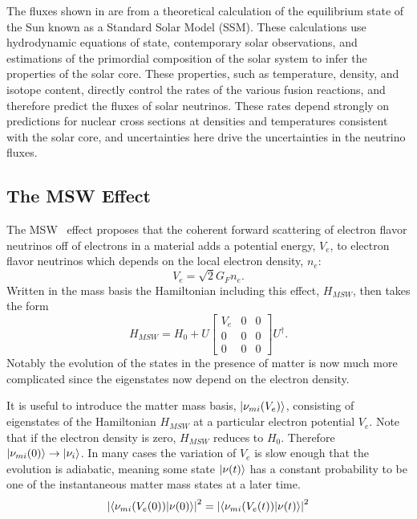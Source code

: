 The fluxes shown in  are from a theoretical calculation of the equilibrium state of the Sun known as a Standard Solar Model (SSM).
These calculations use hydrodynamic equations of state, contemporary solar observations, and estimations of the primordial composition of the solar system to infer the properties of the solar core.
These properties, such as temperature, density, and isotope content, directly control the rates of the various fusion reactions, and therefore predict the fluxes of solar neutrinos.
These rates depend strongly on predictions for nuclear cross sections at densities and temperatures consistent with the solar core, and uncertainties here drive the uncertainties in the neutrino fluxes.

\subsection{The MSW Effect}

The MSW~\cite{wolfenstein,mikheyev} effect proposes that the coherent forward scattering of electron flavor neutrinos off of electrons in a material adds a potential energy, $V_e$, to electron flavor neutrinos which depends on the local electron density, $n_e$:
\begin{equation}
V_e = \sqrt{2} G_F n_e.
\end{equation}
Written in the mass basis the Hamiltonian including this effect, $H_{MSW}$, then takes the form
\begin{equation}
H_{MSW} = H_{0} + U\begin{bmatrix}
V_e & 0 & 0 \\
0 & 0 & 0 \\
0 & 0 & 0
\end{bmatrix}U^\dagger.
\end{equation}
Notably the evolution of the states in the presence of matter is now much more complicated since the eigenstates now depend on the electron density.

It is useful to introduce the matter mass basis, $\ket{\nu_{mi}(V_e)}$, consisting of eigenstates of the Hamiltonian $H_{MSW}$ at a particular electron potential $V_e$.
Note that if the electron density is zero, $H_{MSW}$ reduces to $H_0$. Therefore $\ket{\nu_{mi}(0)} \rightarrow \ket{\nu_{i}}$.
In many cases the variation of $V_e$ is slow enough that the evolution is adiabatic, meaning some state $\ket{\nu(t)}$ has a constant probability to be one of the instantaneous matter mass states at a later time. 
\begin{equation}
\left| \braket{\nu_{mi}(V_e(0))}{\nu(0)} \right|^2 = \left| \braket{\nu_{mi}(V_e(t))}{\nu(t)} \right |^2
\end{equation}


